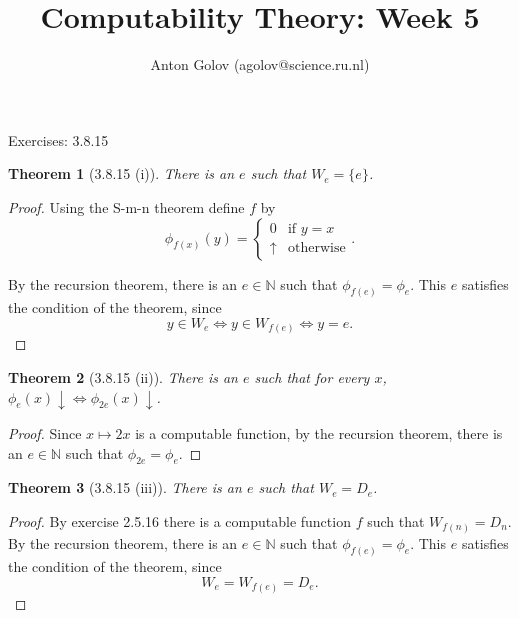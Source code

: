 \documentclass{article}
\title{Computability Theory: Week 5}
\author{Anton Golov (agolov@science.ru.nl)}
\newtheorem{theorem}{Theorem}
\newcommand{\set}[1]{\{ #1 \}}
\newcommand{\terminates}{\!\!\downarrow}
\begin{document}
  \maketitle

  Exercises: 3.8.15

  \begin{theorem}[3.8.15 (i)]
    There is an $e$ such that $W_e = \set{e}$.
  \end{theorem}

  \begin{proof}
    Using the S-m-n theorem define $f$ by
    \[
      \phi_{f(x)}(y) =
      \begin{cases}
        0 & \text{if $y = x$}\\
        \uparrow & \text{otherwise}
      \end{cases}.
    \]

    By the recursion theorem, there is an $e \in \mathbb{N}$ such that $\phi_{f(e)} = \phi_e$.
    This $e$ satisfies the condition of the theorem, since
    \[
      y \in W_e \iff y \in W_{f(e)} \iff y = e.
    \]
  \end{proof}

  \begin{theorem}[3.8.15 (ii)]
    There is an $e$ such that for every $x$, $\phi_e(x)\terminates \iff \phi_{2e}(x)\terminates$.
  \end{theorem}

  \begin{proof}
    Since $x \mapsto 2x$ is a computable function, by the recursion theorem, there is an
    $e \in \mathbb{N}$ such that $\phi_{2e} = \phi_e$.
  \end{proof}

  \begin{theorem}[3.8.15 (iii)]
    There is an $e$ such that $W_e = D_e$.
  \end{theorem}

  \begin{proof}
    By exercise 2.5.16 there is a computable function $f$ such that $W_{f(n)} = D_n$.  By the
    recursion theorem, there is an $e \in \mathbb{N}$ such that $\phi_{f(e)} = \phi_e$.
    This $e$ satisfies the condition of the theorem, since
    \[
      W_e = W_{f(e)} = D_e.
    \]
  \end{proof}
\end{document}
